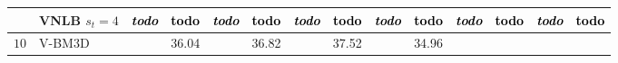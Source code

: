 \documentclass[10pt, journal, twocolumn, final, a4paper]{IEEEtran}
\newcommand{\best}[1]{#1}
\newcommand{\bsic}[1]{\textcolor{black}{\textit{#1}}}
\newcommand{\Bsic}[1]{\textcolor{black}{\textbf{\textit{#1}}}}
\newcommand{\Best}[1]{\textbf{\textcolor{black}{#1}}}
\begin{document}
\begin{table}[htp!]
\begin{center}
{\begin{tabular}{ c | l |c c | c c | c c | c c | c c | c c}
			                      & VNLB   $s_t = 4$     & \Bsic{todo } & \Best{todo } & \Bsic{todo } & \Best{todo } & \Bsic{todo } & \Best{todo } & \Bsic{todo } & \Best{todo } & \Bsic{todo } & \Best{todo } & \Bsic{todo } & \Best{todo } \\\hline
%                                                                                                                                                                                                                                         
			\multirow{1}{*}{$10$}
			                      & V-BM3D               & \bsic{     } &       36.04  & \bsic{     } &       36.82  & \bsic{     } &       37.52  & \bsic{     } &       34.96  & \bsic{     } &              & \bsic{     } &              \\

\end{tabular}}
\end{center}
\end{table}
\end{document}
